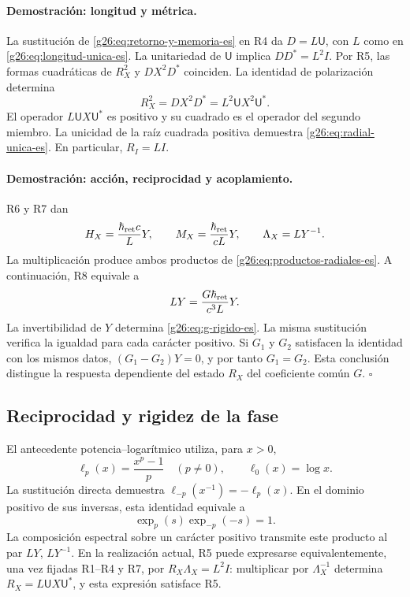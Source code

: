\paragraph{Demostración: longitud y métrica.}
La sustitución de \eqref{g26:eq:retorno-y-memoria-es} en R4 da
\(D=L\mathsf U\), con \(L\) como en \eqref{g26:eq:longitud-unica-es}.
La unitariedad de \(\mathsf U\) implica \(DD^*=L^2I\).
Por R5, las formas cuadráticas de \(R_X^2\) y \(DX^2D^*\) coinciden.
La identidad de polarización determina
\[
 R_X^2=DX^2D^*=L^2\mathsf U X^2\mathsf U^*.
\]
El operador \(L\mathsf U X\mathsf U^*\) es positivo y su cuadrado
es el operador del segundo miembro. La unicidad de la raíz cuadrada
positiva demuestra \eqref{g26:eq:radial-unica-es}. En particular,
\(R_I=LI\).

\paragraph{Demostración: acción, reciprocidad y acoplamiento.}
R6 y R7 dan
\[
 H_X=\frac{\hbar_{\rm ret}c}{L}Y,
 \qquad M_X=\frac{\hbar_{\rm ret}}{cL}Y,
 \qquad \Lambda_X=LY^{-1}.
\]
La multiplicación produce ambos productos de
\eqref{g26:eq:productos-radiales-es}. A continuación, R8 equivale a
\[
 LY=\frac{G\hbar_{\rm ret}}{c^3L}Y.
\]
La invertibilidad de \(Y\) determina \eqref{g26:eq:g-rigido-es}.
La misma sustitución verifica la igualdad para cada carácter positivo.
Si \(G_1\) y \(G_2\) satisfacen la identidad con los mismos datos,
\((G_1-G_2)Y=0\), y por tanto \(G_1=G_2\).
Esta conclusión distingue la respuesta dependiente del estado
\(R_X\) del coeficiente común \(G\). \hfill\(\square\)

\subsection{Reciprocidad y rigidez de la fase}

El antecedente potencia--logarítmico utiliza, para \(x>0\),
\[
 \ell_p(x)=\frac{x^p-1}{p}\quad(p\ne0),
 \qquad \ell_0(x)=\log x.
\]
La sustitución directa demuestra
\(\ell_{-p}(x^{-1})=-\ell_p(x)\). En el dominio positivo de sus
inversas, esta identidad equivale a
\[
 \exp_p(s)\exp_{-p}(-s)=1.
\]
La composición espectral sobre un carácter positivo transmite este
producto al par \(LY\), \(LY^{-1}\). En la realización actual, R5
puede expresarse equivalentemente, una vez fijadas R1--R4 y R7, por
\(R_X\Lambda_X=L^2I\): multiplicar por \(\Lambda_X^{-1}\) determina
\(R_X=L\mathsf U X\mathsf U^*\), y esta expresión satisface R5.

